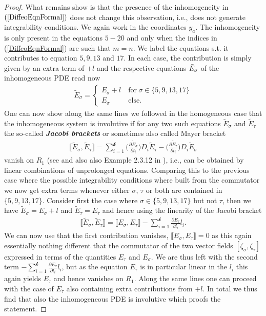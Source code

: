 \begin{proof}
What remains show is that the presence of the inhomogeneity in $(\ref{DiffeoEqnFormal})$ does not change this observation, i.e., does not generate integrability conditions. We again work in the coordinates $y_a$. The inhomogeneity is only present in the equations $5-20$ and only when the indices in (\ref{DiffeoEqnFormal}) are such that $m = n$. We label the equations s.t. it contributes to equation $5,9,13$ and $17$. In each case, the contribution is simply given by an extra term of $+l$ and the respective equations $\Tilde{E}_{\sigma}$ of the inhomogeneous PDE read now 
\begin{align}
     \tilde{E}_{\sigma} = \begin{cases}
     E_{\sigma} + l \ &\text{for} \ \sigma \in \{ 5,9,13,17 \}\\
     E_{\sigma} \ &\text{else}.
     \end{cases}
\end{align}
One can now show along the same lines we followed in the homogeneous case that the inhomogeneous system is involutive if for any two such equations $\tilde{E}_{\sigma}$ and $\tilde{E}_{\tau}$ the so-called \textit{\textbf{Jacobi brackets}} or sometimes also called Mayer bracket 
\begin{align}
  \llbracket \tilde{E}_{\sigma}, \tilde{E}_{\tau} \rrbracket = \sum _{i = 1}^{\mathcal{k}} \biggl(\frac{\partial \tilde{E}_{\sigma}}{\partial l_i}\biggr) D_{i}\tilde{E}_{\tau} -  \biggl(\frac{\partial \tilde{E}_{\tau}}{\partial l_i}\biggr) D_{i}\tilde{E}_{\sigma} 
\end{align}
vanish on $R_1$ (see  \cite{seiler1994analysis} and also also Example 2.3.12 in \cite{seiler2009involution}), i.e., can be obtained by linear combinations of unprolonged equations. Comparing this to the previous case where the possible integrability conditions where built from the commutator we now get extra terms whenever either $\sigma$, $\tau$ or both are contained in $\{ 5,9,13,17 \}$. Consider first the case where $\sigma \in \{5,9,13,17\}$ but not $\tau$, then we have $\tilde{E}_{\sigma} = E_{\sigma} + l$ and $\tilde{E}_{\tau} = E_{\tau}$ and hence using the linearity of the Jacobi bracket
\begin{align}
    \llbracket \tilde{E}_{\sigma}, \tilde{E}_{\tau} \rrbracket = \llbracket E_{\sigma}, E_{\tau} \rrbracket - \sum_{i=1}^{\mathcal{k}} \frac{\partial E_{\tau}}{\partial l_i} l_i.
\end{align}
We can now use that the first contribution vanishes, $\llbracket E_{\sigma}, E_{\tau} \rrbracket = 0$ as this again essentially nothing different that the commutator of the two vector fields $[\zeta_{\sigma},\zeta_{\tau}]$ expressed in terms of the quantities $E_{\tau}$ and $E_{\sigma}$. We are thus left with the second term $- \sum_{i=1}^{\mathcal{k}} \frac{\partial E_{\tau}}{\partial l_i} l_i$, but as the equation $E_{\tau}$ is in particular linear in the $l_i$ this again yields $E_{\tau}$ and hence vanishes on $R_1$. Along the same lines one can proceed with the case of $E_{\tau}$ also containing extra contributions from $+l$. In total we thus find that also the inhomogeneous PDE is involutive which proofs the statement.
\end{proof}

